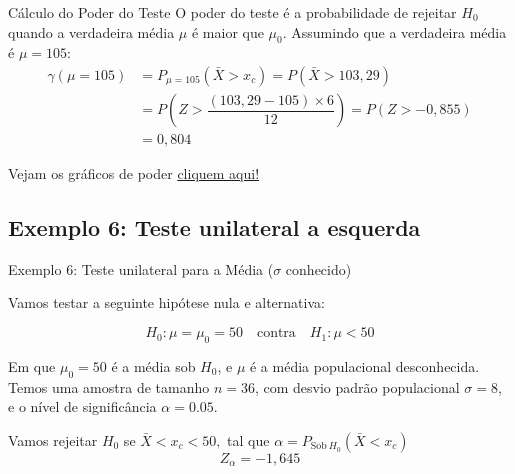 \documentclass[12pt]{beamer}
\begin{document}
\begin{frame}{}
	\begin{block}{Cálculo do Poder do Teste}
		\justifying
		O poder do teste é a probabilidade de rejeitar $H_0$ quando a verdadeira média $\mu$ é maior que $\mu_0$. Assumindo que a verdadeira média é $\mu = 105:$
		\begin{align*}
			\gamma(\mu=105)&=P_{\mu=105}(\bar{X}>x_{c})=P(\bar{X}>103,29)\\
			&=P(Z>\dfrac{(103,29-105)\times6}{12})=P(Z>-0,855)\\
			&=0,804
		\end{align*}
	\end{block}
\end{frame}

\begin{frame}{}
	\begin{block}{}
		Vejam os gráficos de poder \href{https://est711.shinyapps.io/FuncaoPoder/}{cliquem aqui!}
	\end{block}
\end{frame}

\subsection{Exemplo 6: Teste unilateral a esquerda}
\begin{frame}{Exemplo 6: Teste unilateral para a Média ($\sigma$ conhecido)}
	\begin{block}{}
		\justifying
		Vamos testar a seguinte hipótese nula e alternativa:
		
		\[
		H_0: \mu = \mu_0 = 50 \quad \text{contra} \quad H_1: \mu < 50
		\]
		
		Em que \( \mu_0 = 50 \) é a média sob \( H_0 \), e \( \mu \) é a média populacional desconhecida. Temos uma amostra de tamanho \( n = 36 \), com desvio padrão populacional \( \sigma = 8 \), e o nível de significância \( \alpha = 0.05 \).
		
		
	\end{block}
	\pause
	\begin{block}{}
		\justifying
		Vamos rejeitar $H_0$ se $\bar{X}<x_{c}<50,$ tal que $\alpha=P_{\text{Sob}~H_{0}}(\bar{X}<x_{c})$
		\[
		Z_{\alpha} = -1,645
		\]	
	\end{block}
\end{frame}
\end{document}
